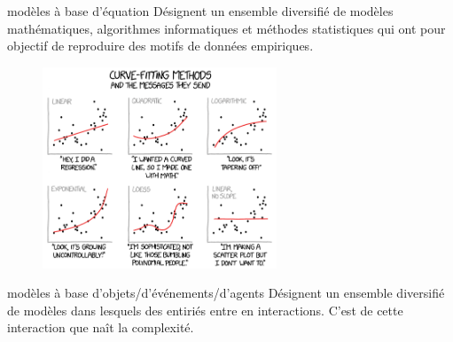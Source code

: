 \documentclass[newPxFont]{beamer}
\begin{document}
\begin{frame}[c]{modèles à base d’équation}
  \vspace{-2em}
  Désignent un ensemble diversifié de modèles mathématiques, algorithmes informatiques et méthodes statistiques qui ont pour objectif de reproduire des motifs de données empiriques.
  \begin{figure}
   \includegraphics[height=6cm]{img/a_curve_fitting.png}
  \end{figure}

\end{frame}

\begin{frame}[c]{modèles à base d’objets/d’événements/d’agents}
  \vspace{-2em}
  Désignent un ensemble diversifié de modèles dans lesquels des entiriés entre en interactions. C'est de cette interaction que naît la complexité.
  \begin{figure}
   	\centering
   		\hspace{0.2em} %
      \hspace{0.2em} %
  \end{figure}

\end{frame}
\end{document}
